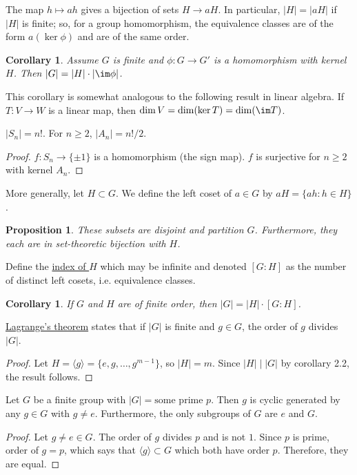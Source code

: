 \documentclass[11pt, oneside]{amsart}
\numberwithin{equation}{section}
\numberwithin{theorem}{section}
\newtheorem{corollary}[theorem]{Corollary}
\newtheorem{proposition}[theorem]{Proposition}
\theoremstyle{definition}
\begin{document}
The map $h\mapsto ah$ gives a bijection of sets $H\to a H$. In particular, $|H| = |aH|$ if $|H|$ is finite; so, for a group homomorphism, the equivalence classes are of the form $a(\ker \phi)$ and are of the same order. 
\begin{corollary} Assume $G$ is finite and $\phi : G\to G'$ is a homomorphism with kernel $H$. Then $|G| = |H|\cdot|\im\phi|$.\end{corollary}

This corollary is somewhat analogous to the following result in linear algebra. If $T:V\to W$ is a linear map, then $\dim V = \dim (\ker T) =\dim (\im T)$.

$|S_n| = n!$. For $n\geqslant 2$, $|A_n|=n!/2$.
\begin{proof}
$f:S_n\to \{\pm 1\}$ is a homomorphism (the sign map). $f$ is surjective for $n\geqslant 2$ with kernel $A_n$.
\end{proof}

More generally, let $H\subset G$. We define the left coset of $a\in G$ by $aH = \{ah:h\in H\}$. 
 \begin{proposition}
These subsets are disjoint and partition $G$. Furthermore, they each are in set-theoretic bijection with $H$.
\end{proposition}

Define the \underline{index of $H$} which may be infinite and denoted $[G:H]$ as the number of distinct left cosets, i.e. equivalence classes.
\begin{corollary}
If $G$ and $H$ are of finite order, then $|G| = |H| \cdot [G:H]$.
\end{corollary}

\underline{Lagrange's theorem} states that if $|G|$ is finite and $g\in G$, the order of $g$ divides $|G|$.
\begin{proof}
Let $H=\langle g\rangle = \{e,g,\hdots, g^{m-1}\}$, so $|H|=m$. Since $|H|\mid |G|$ by corollary 2.2, the result follows.
\end{proof}

Let $G$ be a finite group with $|G|=\textrm{some prime } p$. Then $g$ is cyclic generated by any $g\in G $ with $g\neq e$. Furthermore, the only subgroups of $G$ are $e$ and $G$.
\begin{proof}
Let $g\neq e\in G$. The order of $g$ divides $p$ and is not $1$. Since $p$ is prime, order of $g=p$, which says that $\langle g\rangle \subset G$ which both have order $p$. Therefore, they are equal.
\end{proof}
\end{document}
